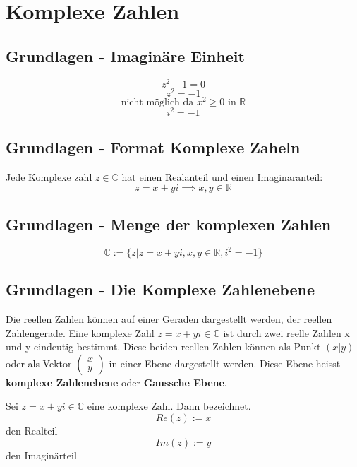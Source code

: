 \documentclass[10pt,a4paper,twocolumn]{article}
\newcommand{\seccol}{black}
\newcommand{\setseccol}[1]{\renewcommand{\seccol}{#1}}
\begin{document}
	\setseccol{c1}
	\section{Komplexe Zahlen}
	\subsection{Grundlagen - Imaginäre Einheit}
	$$z^2 + 1 = 0$$
	$$z^2 = -1$$
	$$\text{nicht möglich da } x^2 \ge 0 \text{ in } \mathbb{R}$$
	$$i^2 = -1$$
	
	\subsection{Grundlagen - Format Komplexe Zaheln}
	Jede Komplexe zahl $z \in \mathbb{C}$ hat einen Realanteil und einen Imaginaranteil:
	$$z=x+yi \implies x,y \in \mathbb{R}$$
	
	\subsection{Grundlagen - Menge der komplexen Zahlen}
	
	$$ \mathbb{C} := \{z| z=x +yi, x,y \in \mathbb{R}, i^2 = -1\}$$
	
	\subsection{Grundlagen - Die Komplexe Zahlenebene}
	
	Die reellen Zahlen können auf einer Geraden dargestellt werden, der reellen Zahlengerade. Eine komplexe
	Zahl $z=x+yi \in \mathbb{C}$ ist durch zwei reelle Zahlen x und y eindeutig bestimmt. Diese beiden reellen Zahlen
	können als Punkt $(x|y)$ oder als Vektor $\begin{pmatrix} x \\ y \end{pmatrix}$ in einer Ebene dargestellt werden. Diese Ebene heisst \textbf{komplexe Zahlenebene} oder \textbf{Gaussche Ebene}.
	
	Sei $z=x+yi \in \mathbb{C}$ eine komplexe Zahl. Dann bezeichnet.
	$$Re(z):=x$$
	den Realteil
	$$Im(z):=y$$
	den Imaginärteil
	
\end{document}
